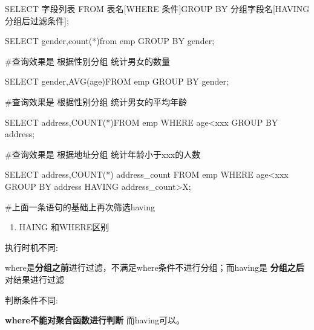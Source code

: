 \documentclass[
  letterpaper,
  DIV=11,
  numbers=noendperiod]{scrreprt}
\newenvironment{Shaded}{\begin{snugshade}}{\end{snugshade}}
\newcommand{\FunctionTok}[1]{\textcolor[rgb]{0.28,0.35,0.67}{#1}}
\newcommand{\KeywordTok}[1]{\textcolor[rgb]{0.00,0.23,0.31}{#1}}
\newcommand{\NormalTok}[1]{\textcolor[rgb]{0.00,0.23,0.31}{#1}}
\newcommand{\OperatorTok}[1]{\textcolor[rgb]{0.37,0.37,0.37}{#1}}
\providecommand{\tightlist}{%
  \setlength{\itemsep}{0pt}\setlength{\parskip}{0pt}}\usepackage{longtable,booktabs,array}
\begin{document}
\begin{Shaded}
\begin{Highlighting}[]
\KeywordTok{SELECT}\NormalTok{ 字段列表 }\KeywordTok{FROM}\NormalTok{ 表名[}\KeywordTok{WHERE}\NormalTok{ 条件]}\KeywordTok{GROUP} \KeywordTok{BY}\NormalTok{ 分组字段名[}\KeywordTok{HAVING}\NormalTok{ 分组后过滤条件];}

\KeywordTok{SELECT}\NormalTok{ gender,}\FunctionTok{count}\NormalTok{(}\OperatorTok{*}\NormalTok{)}\KeywordTok{from}\NormalTok{ emp }\KeywordTok{GROUP} \KeywordTok{BY}\NormalTok{ gender;}

\NormalTok{\#查询效果是 根据性别分组 统计男女的数量}

\KeywordTok{SELECT}\NormalTok{ gender,}\FunctionTok{AVG}\NormalTok{(age)}\KeywordTok{FROM}\NormalTok{ emp }\KeywordTok{GROUP} \KeywordTok{BY}\NormalTok{ gender;}

\NormalTok{\#查询效果是 根据性别分组 统计男女的平均年龄}

\KeywordTok{SELECT}\NormalTok{ address,}\FunctionTok{COUNT}\NormalTok{(}\OperatorTok{*}\NormalTok{)}\KeywordTok{FROM}\NormalTok{ emp }\KeywordTok{WHERE}\NormalTok{ age}\OperatorTok{\textless{}}\NormalTok{xxx }\KeywordTok{GROUP} \KeywordTok{BY}\NormalTok{ address;}

\NormalTok{\#查询效果是 根据地址分组 统计年龄小于xxx的人数}

\KeywordTok{SELECT}\NormalTok{ address,}\FunctionTok{COUNT}\NormalTok{(}\OperatorTok{*}\NormalTok{) address\_count }\KeywordTok{FROM}\NormalTok{ emp }\KeywordTok{WHERE}\NormalTok{ age}\OperatorTok{\textless{}}\NormalTok{xxx }\KeywordTok{GROUP} \KeywordTok{BY}\NormalTok{ address }\KeywordTok{HAVING}\NormalTok{ address\_count}\OperatorTok{\textgreater{}}\NormalTok{X;}

\NormalTok{\#上面一条语句的基础上再次筛选having}
\end{Highlighting}
\end{Shaded}

\begin{enumerate}
\def\labelenumi{\arabic{enumi}.}
\setcounter{enumi}{1}
\tightlist
\item
  HAING 和WHERE区别
\end{enumerate}

执行时机不同:

where是\textbf{分组之前}进行过滤，不满足where条件不进行分组；而having是
\textbf{分组之后}对结果进行过滤

判断条件不同:

\textbf{where不能对聚合函数进行判断} 而having可以。
\end{document}
